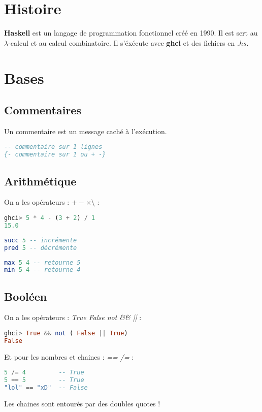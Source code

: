 



    \section{Histoire}
        \textbf{Haskell} est un langage de programmation fonctionnel créé en 1990. Il est sert au $\lambda$-calcul et au calcul combinatoire. Il s'éxécute avec \textbf{ghci} et des fichiers en $.hs$.
    \section{Bases}
        \subsection{Commentaires}
            Un commentaire est un message caché à l'exécution.
            \begin{lstlisting}[language=Haskell]
-- commentaire sur 1 lignes
{- commentaire sur 1 ou + -}
            \end{lstlisting}
        \subsection{Arithmétique}
            On a les opérateurs : $+ - \times \setminus$ :
            \begin{lstlisting}[language=Haskell]
ghci> 5 * 4 - (3 + 2) / 1
15.0
            \end{lstlisting}
            \begin{lstlisting}[language=Haskell]
succ 5 -- incrémente
pred 5 -- décrémente
            \end{lstlisting}
            \begin{lstlisting}[language=Haskell]
max 5 4 -- retourne 5
min 5 4 -- retourne 4
            \end{lstlisting}
        \subsection{Booléen}
            On a les opérateurs : \textit{True False not \&\& ||} :
            \begin{lstlisting}[language=Haskell]
ghci> True && not ( False || True)
False
            \end{lstlisting}
            Et pour les nombres et chaines : \textit{== /=} :
            \begin{lstlisting}[language=Haskell]
5 /= 4         -- True
5 == 5         -- True
"lol" == "xD"  -- False
            \end{lstlisting}
            Les chaines sont entourés par des doubles quotes !
